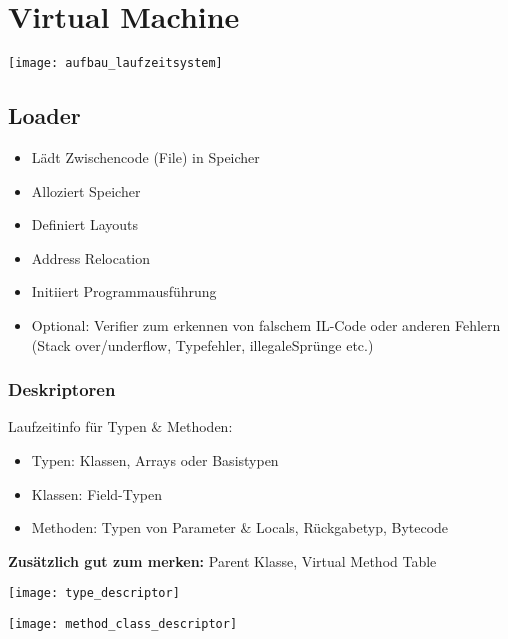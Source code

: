 
\section{Virtual Machine}
\begin{minipage}{0,4\linewidth}
    \texttt{[image: aufbau\_laufzeitsystem]}
\end{minipage}
\begin{minipage}{0,6\linewidth}
    \subsection{Loader}
    \begin{itemize}[topsep=0pt]
        \itemsep -0.2em
        \item Lädt Zwischencode (File) in Speicher
        \item Alloziert Speicher
        \item Definiert Layouts
        \item Address Relocation
        \item Initiiert Programmausführung
        \item Optional: Verifier zum erkennen von falschem IL-Code oder anderen Fehlern (Stack over/underflow, Typefehler, illegaleSprünge etc.)
    \end{itemize}
\end{minipage}

\subsubsection{Deskriptoren}
Laufzeitinfo für Typen \& Methoden:
\begin{itemize}[topsep=0pt]
    \itemsep -0.2em
    \item Typen: Klassen, Arrays oder Basistypen
    \item Klassen: Field-Typen
    \item Methoden: Typen von Parameter \& Locals, Rückgabetyp, Bytecode
\end{itemize}
\textbf{Zusätzlich gut zum merken:} Parent Klasse, Virtual Method Table\\
\begin{minipage}{0,5\linewidth}
    \texttt{[image: type\_descriptor]}
\end{minipage}
\begin{minipage}{0,5\linewidth}
    \texttt{[image: method\_class\_descriptor]}
\end{minipage}

